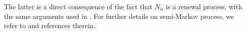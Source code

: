 \documentclass[]{amsart}
\numberwithin{equation}{section}
\newtheorem{defn}{Definition}[section]
\newtheorem{prop}[thm]{Proposition}
\theoremstyle{remark}
\theoremstyle{definition}
\DeclareMathOperator{\R}{\mathbb{R}}
\DeclareMathOperator{\cF}{\mathcal{F}}
\DeclareMathOperator{\cB}{\mathcal{B}}
\DeclareMathOperator{\bP}{\mathbb{P}}
\begin{document}
The latter is a direct consequence of the fact that $N_\alpha$ is a renewal process, with the same arguments used in \cite[Chapter III.3]{gikhman2004theory}. For further details on semi-Markov process, we refer to \cite{harlamov2013continuous} and references therein.
%
%
%
%
%
%
%
\end{document}
